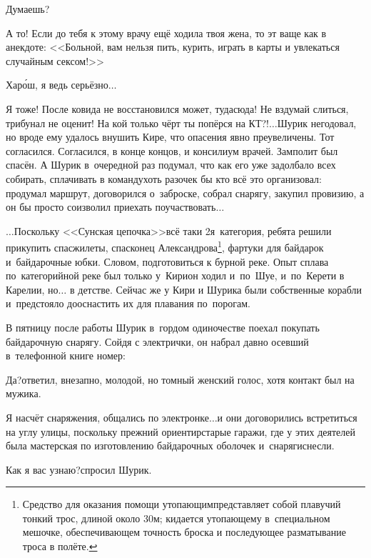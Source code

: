 \diagdash Думаешь?

\diagdash А то! Если до тебя к этому врачу ещё ходила твоя жена, то эт ваще как в анекдоте: <<Больной, вам нельзя пить, курить, играть в карты и увлекаться случайным сексом!>>

\diagdash Хар\'{о}ш, я ведь серьёзно$\ldots$

\diagdash Я тоже! После ковида не восстановился может, туда\sdash сюда! Не вздумай слиться, трибунал не оценит! На кой только чёрт ты попёрся на КТ?!$\ldots$\mdash Шурик негодовал, но вроде ему удалось внушить Кире, что опасения явно преувеличены. Тот согласился. Согласился, в конце концов, и консилиум врачей. Замполит был спасён. А Шурик в~очередной раз подумал, что как его уже задолбало всех собирать, сплачивать в команду\mdash хоть разочек бы кто всё это организовал: продумал маршрут, договорился о~заброске, собрал снарягу, закупил провизию, а он бы просто соизволил приехать поучаствовать$\ldots$

\vspace{0.5cm}
\renewcommand*{\thefootnote}{\fnsymbol{footnote}}
$\ldots$Поскольку <<Сунская цепочка>>\mdash всё таки 2\sdash я~категория, ребята решили прикупить спасжилеты, спасконец Александрова\footnote[1]{Средство для оказания помощи утопающим\mdash представляет собой плавучий тонкий трос, длиной около 30\thinspace м; кидается утопающему в~специальном мешочке, обеспечивающем точность броска и последующее разматывание троса в полёте.}, фартуки для байдарок и~байдарочные юбки. Словом, подготовиться к бурной реке. Опыт сплава по~категорийной реке был только у~Кири\mdash он ходил и~по~Шуе, и~по~Керети в Карелии, но$\ldots$ в детстве. Сейчас же у Кири и Шурика были собственные корабли и~предстояло дооснастить их для плавания по~порогам. 

В пятницу после работы Шурик в~гордом одиночестве поехал покупать байдарочную снарягу. Сойдя с электрички, он набрал давно осевший в~телефонной книге номер:

\diagdash Да?\mdash ответил, внезапно, молодой, но томный женский голос, хотя контакт был на мужика.

\diagdash Я насчёт снаряжения, общались по электронке$\ldots$\mdash и они договорились встретиться на углу улицы, поскольку прежний ориентир\mdash старые гаражи, где у этих деятелей была мастерская по изготовлению байдарочных оболочек и~снаряги\mdash снесли.

\diagdash Как я вас узнаю?\mdash спросил Шурик.

